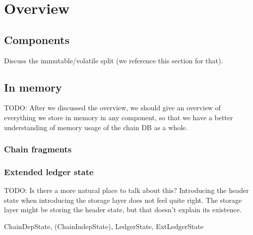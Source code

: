 \chapter{Overview}
\label{storage}

\section{Components}
\label{storage:components}


Discuss the immutable/volatile split (we reference this section for that).

\section{In memory}
\label{storage:inmemory}

TODO: After we discussed the overview, we should give an overview of everything
we store in memory in any component, so that we have a better understanding of
memory usage of the chain DB as a whole.

\subsection{Chain fragments}
\label{storage:fragments}

\subsection{Extended ledger state}
\label{storage:extledgerstate}
\label{storage:headerstate}

TODO: Is there a more natural place to talk about this? Introducing the
header state when introducing the storage layer does not feel quite right.
The storage layer might be storing the header state, but that doesn't
explain its existence.

ChainDepState, (ChainIndepState), LedgerState, ExtLedgerState

